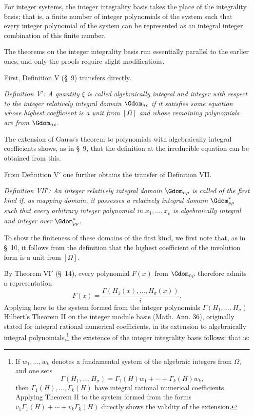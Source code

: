 \documentclass[11pt]{article}
\begin{document}
For integer systems, the integer integrality basis takes the place of the integrality basis; that is, a finite number of integer polynomials of the system such that every integer polynomial of the system can be represented as an integral integer combination of this finite number.

The theorems on the integer integrality basis run essentially parallel to the earlier ones, and only the proofs require slight modifications.

First, Definition V (\S\ 9) transfers directly.

\emph{Definition V$'$: A quantity $\xi$ is called algebraically integral and integer with respect to the integer relatively integral domain $\Gdom_{n\rho}$ if it satisfies some equation whose highest coefficient is a unit from $[\Omega]$ and whose remaining polynomials are from $\Gdom_{n\rho}$.}

The extension of Gauss's theorem to polynomials with algebraically integral coefficients shows, as in \S\ 9, that the definition at the irreducible equation can be obtained from this.

From Definition V$'$ one further obtains the transfer of Definition VII.

\emph{Definition VII$'$: An integer relatively integral domain $\Gdom_{n\rho}$ is called of the first kind if, as mapping domain, it possesses a relatively integral domain $\Gdom^*_{\rho\rho}$ such that every arbitrary integer polynomial in $x_1,
\ldots,x_\rho$ is algebraically integral and integer over $\Gdom^*_{\rho\rho}$.}

To show the finiteness of these domains of the first kind, we first note that, as in \S\ 10, it follows from the definition that the highest coefficient of the involution form is a unit from $[\Omega]$.

By Theorem VI$'$ (\S\ 14), every polynomial $F(x)$ from $\Gdom_{n\rho}$ therefore admits a representation
\[
  F(x)=\frac{\Gamma(H_1(x),\ldots,H_\sigma(x))}{i}.
\]
Applying here to the system formed from the integer polynomials $\Gamma(H_1,
\ldots,H_\sigma)$ Hilbert's Theorem II on the integer module basis (Math. Ann. 36), originally stated for integral rational numerical coefficients, in its extension to algebraically integral polynomials,\footnote{If $w_1,
\ldots,w_k$ denotes a fundamental system of the algebraic integers from $\Omega$, and one sets
\[
  \Gamma(H_1,
\ldots,H_\sigma)=\Gamma_1(H)w_1+\cdots+\Gamma_k(H)w_k,
\]
then $\Gamma_1(H),
\ldots,\Gamma_k(H)$ have integral rational numerical coefficients. Applying Theorem II to the system formed from the forms $v_1\Gamma_1(H)+\cdots+v_k\Gamma_k(H)$ directly shows the validity of the extension.} the existence of the integer integrality basis follows; that is:
\end{document}
